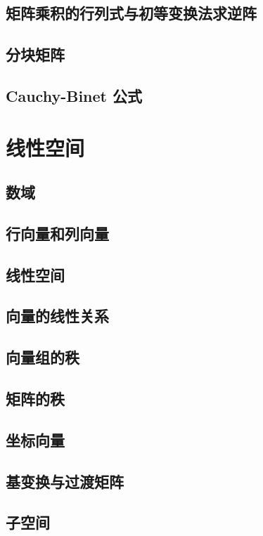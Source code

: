 \documentclass[a4paper, 11pt]{ctexbook}
\begin{document}
        \section{矩阵乘积的行列式与初等变换法求逆阵}
            
        \section{分块矩阵}
        \section{Cauchy-Binet 公式}
    \chapter{线性空间}
        \section{数域}
        \section{行向量和列向量}
        \section{线性空间}
            
        \section{向量的线性关系}
            
        \section{向量组的秩}
            
        \section{矩阵的秩}
        \section{坐标向量}
        \section{基变换与过渡矩阵}
        \section{子空间}
\end{document}

